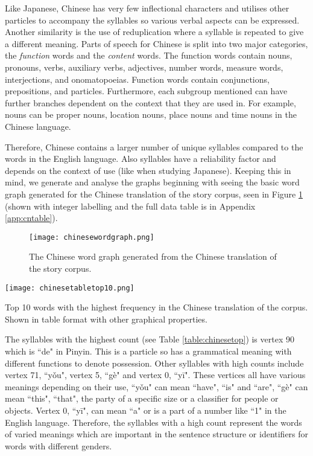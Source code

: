 Like Japanese, Chinese has very few inflectional characters and utilises other particles to accompany the syllables so various verbal aspects can be expressed. Another similarity is the use of reduplication where a syllable is repeated to give a different meaning. Parts of speech for Chinese is split into two major categories, the \emph{function} words and the \emph{content} words. The function words contain nouns, pronouns, verbs, auxiliary verbs, adjectives, number words, measure words, interjections, and onomatopoeias. Function words contain conjunctions, prepositions, and particles. Furthermore, each subgroup mentioned can have further branches dependent on the context that they are used in. For example, nouns can be proper nouns, location nouns, place nouns and time nouns in the Chinese language.

Therefore, Chinese contains a larger number of unique syllables compared to the words in the English language. Also syllables have a reliability factor and depends on the context of use (like when studying Japanese). Keeping this in mind, we generate and analyse the graphs beginning with seeing the basic word graph generated for the Chinese translation of the story corpus, seen in Figure \ref{fig:cngraph} (shown with integer labelling and the full data table is in Appendix \ref{app:cntable}).

\begin{figure}[!htb]
\centering
\texttt{[image: chinesewordgraph.png]}
\caption{The Chinese word graph generated from the Chinese translation of the story corpus.}
\label{fig:cngraph}
\end{figure}

\begin{table}[!htb]
\centering
\texttt{[image: chinesetabletop10.png]}
\caption{Top 10 words with the highest frequency in the Chinese translation of the corpus. Shown in table format with other graphical properties. }
\label{table:chinesetop}
\end{table}

The syllables with the highest count (see Table \ref{table:chinesetop}) is vertex 90 which is ``de" in Pinyin. This is a particle so has a grammatical meaning with different functions to denote possession. Other syllables with high counts include vertex 71, ``yǒu", vertex 5, ``gè" and vertex 0, ``yī". These vertices all have various meanings depending on their use, ``yǒu" can mean ``have", ``is" and ``are", ``gè" can mean ``this", ``that", the party of a specific size or a classifier for people or objects. Vertex 0, ``yī", can mean ``a" or is a part of a number like ``1" in the English language. Therefore, the syllables with a high count represent the words of varied meanings which are important in the sentence structure or identifiers for words with different genders.

